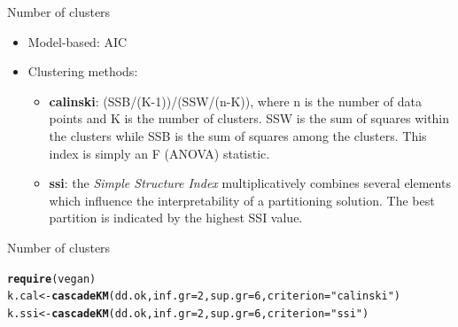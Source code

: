 \documentclass[10pt,xcolor=dvipsnames]{beamer}\usepackage[]{graphicx}\usepackage[]{color}
\makeatletter
\newcommand{\hlnum}[1]{\textcolor[rgb]{0.686,0.059,0.569}{#1}}%
\newcommand{\hlstr}[1]{\textcolor[rgb]{0.192,0.494,0.8}{#1}}%
\newcommand{\hlstd}[1]{\textcolor[rgb]{0.345,0.345,0.345}{#1}}%
\newcommand{\hlkwb}[1]{\textcolor[rgb]{0.69,0.353,0.396}{#1}}%
\newcommand{\hlkwc}[1]{\textcolor[rgb]{0.333,0.667,0.333}{#1}}%
\newcommand{\hlkwd}[1]{\textcolor[rgb]{0.737,0.353,0.396}{\textbf{#1}}}%
\newenvironment{kframe}{%
 \def\at@end@of@kframe{}%
 \ifinner\ifhmode%
  \def\at@end@of@kframe{\end{minipage}}%
  \begin{minipage}{\columnwidth}%
 \fi\fi%
 \def\FrameCommand##1{\hskip\@totalleftmargin \hskip-\fboxsep
 \colorbox{shadecolor}{##1}\hskip-\fboxsep
     \hskip-\linewidth \hskip-\@totalleftmargin \hskip\columnwidth}%
 \MakeFramed {\advance\hsize-\width
   \@totalleftmargin\z@ \linewidth\hsize
   \@setminipage}}%
 {\par\unskip\endMakeFramed%
 \at@end@of@kframe}
\newenvironment{knitrout}{}{} %
\makeatother
\begin{document}
\begin{frame}{Number of clusters}

\begin{itemize}
 \item Model-based: AIC
 \item Clustering methods: 
 \begin{itemize}
  \item \textbf{calinski}: (SSB/(K-1))/(SSW/(n-K)), where n is the number of data points and K is the number of clusters. 
               SSW is the sum of squares within the clusters while SSB is the sum of squares among the clusters. 
               This index is simply an F (ANOVA) statistic.
  \item \textbf{ssi}: the \emph{Simple Structure Index} multiplicatively combines several elements which influence the 
                      interpretability of a partitioning solution. The best partition is indicated by the highest 
                      SSI value.
 \end{itemize} 
\end{itemize}

\end{frame}

\begin{frame}{Number of clusters}

\begin{knitrout}\footnotesize
{}\color{fgcolor}\begin{kframe}
\begin{alltt}
\hlkwd{require}\hlstd{(vegan)}
\hlstd{k.cal} \hlkwb{<-} \hlkwd{cascadeKM}\hlstd{(dd.ok,} \hlkwc{inf.gr}\hlstd{=}\hlnum{2}\hlstd{,} \hlkwc{sup.gr}\hlstd{=}\hlnum{6}\hlstd{,} \hlkwc{criterion}\hlstd{=}\hlstr{"calinski"}\hlstd{)}
\hlstd{k.ssi} \hlkwb{<-} \hlkwd{cascadeKM}\hlstd{(dd.ok,} \hlkwc{inf.gr}\hlstd{=}\hlnum{2}\hlstd{,} \hlkwc{sup.gr}\hlstd{=}\hlnum{6}\hlstd{,} \hlkwc{criterion}\hlstd{=}\hlstr{"ssi"}\hlstd{)}
\end{alltt}
\end{kframe}
\end{knitrout}

\end{frame}
\end{document}
